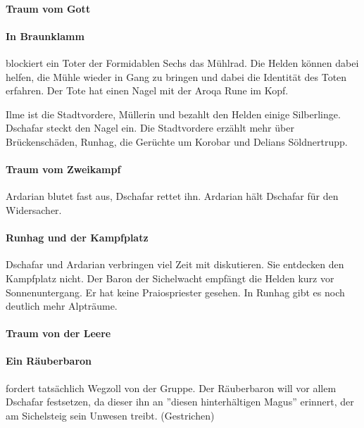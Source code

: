 \paragraph{Traum vom Gott} 










\paragraph{In Braunklamm} blockiert ein Toter der Formidablen Sechs das Mühlrad. Die Helden können dabei helfen, die Mühle wieder in Gang zu bringen und dabei die Identität des Toten erfahren. Der Tote hat einen Nagel mit der Aroqa Rune im Kopf.

Ilme ist die Stadtvordere, Müllerin und bezahlt den Helden einige Silberlinge. Dschafar steckt den Nagel ein. Die Stadtvordere erzählt mehr über Brückenschäden, Runhag, die Gerüchte um Korobar und Delians Söldnertrupp.

\paragraph{Traum vom Zweikampf} Ardarian blutet fast aus, Dschafar rettet ihn. Ardarian hält Dschafar für den Widersacher.

\paragraph{Runhag und der Kampfplatz} Dschafar und Ardarian verbringen viel Zeit mit diskutieren. Sie entdecken den Kampfplatz nicht. Der Baron der Sichelwacht empfängt die Helden kurz vor Sonnenuntergang. Er hat keine Praiospriester gesehen. In Runhag gibt es noch deutlich mehr Alpträume.










\paragraph{Traum von der Leere}

\paragraph{Ein Räuberbaron} fordert tatsächlich Wegzoll von der Gruppe. Der Räuberbaron will vor allem Dschafar festsetzen, da dieser ihn an ''diesen hinterhältigen Magus'' erinnert, der am Sichelsteig sein Unwesen treibt. (Gestrichen)


